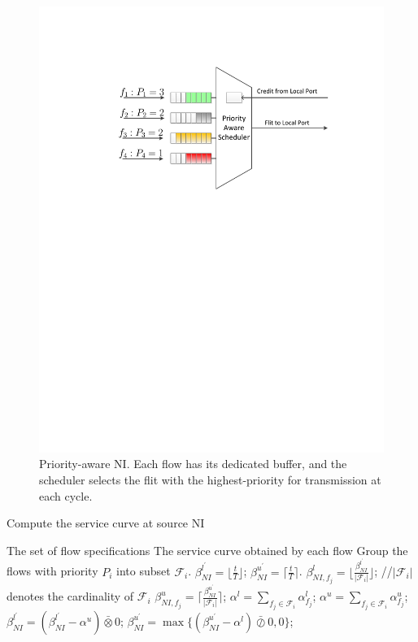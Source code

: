 \documentclass[preprint]{elsarticle}
\begin{document}
\begin{figure}
  \centering
  \includegraphics[scale=0.45]{figures/NI.pdf}
  \caption{Priority-aware NI. Each flow has its dedicated buffer, and the scheduler selects the flit with the highest-priority for transmission at each cycle.}\label{ni}
\end{figure}
\begin{algorithm}
\caption{Compute the service curve at source NI}\label{alg:scatni}
\begin{algorithmic}[1]
\Require The set of flow specifications
\Ensure The service curve obtained by each flow
\State Group the flows with priority $P_i$ into subset $\mathcal{F}_i$.
\State $\beta_{NI}^{l^\prime}=\lfloor\frac{t}{T}\rfloor$; $\beta_{NI}^{u^\prime}=\lceil\frac{t}{T}\rceil$.
        \State $\beta_{NI,f_j}^l=\lfloor\frac{\beta_{NI}^{l^\prime}}{|\mathcal{F}_i|}\rfloor$; //$|\mathcal{F}_i|$ denotes the cardinality of $\mathcal{F}_i$
        \State $\beta_{NI,f_j}^u=\lceil\frac{\beta_{NI}^{u^\prime}}{|\mathcal{F}_i|}\rceil$;
    \EndFor
    \State $\alpha^l=\sum_{f_j\in \mathcal{F}_i}\alpha^l_{f_j}$; $\alpha^u=\sum_{f_j\in \mathcal{F}_i}\alpha^u_{f_j}$;
    \State $\beta_{NI}^{l^\prime}=(\beta_{NI}^{l^\prime}-\alpha^u)\bar{\otimes}0$; $\beta_{NI}^{u^\prime}=\max\{(\beta_{NI}^{u^\prime}-\alpha^l)\bar{\oslash}0,0\}$;
\EndFor
\end{algorithmic}
\end{algorithm}
\end{document}
